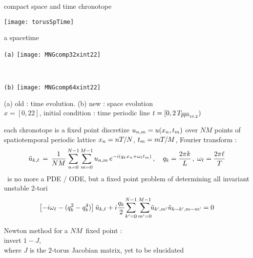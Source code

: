 \begin{frame}{compact space and time chronotope}
\begin{center}
\texttt{[image: torusSpTime]}
\end{center}
\end{frame}

\begin{frame}{a spacetime \po}
\begin{center}
  \begin{minipage}[height=.40\textheight]{.35\textwidth}
    \centering \small{\texttt{(a)}}
    \texttt{[image: MNGcomp32xint22]}
  \end{minipage}
~~~~~~~~~
  \begin{minipage}[height=.40\textheight]{.35\textwidth}
    \centering \small{\texttt{(b)}}
    \texttt{[image: MNGcomp64xint22]}
  \end{minipage}
\end{center}
    (a) old : time evolution. (b) new : space evolution
    \\
    $x=[0,22]$,
       initial condition : time periodic line $t = [0,
   2\,T_{\overline{ppo}_{10.2}})$
\end{frame}

\begin{frame}{each chronotope is a fixed point}
discretize $u_{n,m} = u(x_n,t_m)$ over
$N M$ points of spatiotemporal periodic lattice $x_n = n {T_{}}/N$,
 $t_m = m {T_{}}/M$, Fourier transform :
%
\[
\tilde{u}_{k,\ell} \,=\,
  \frac{1}{NM} \sum^{N-1}_{n=0} \sum^{M-1}_{m=0}
  u_{n,m} \, e^{-i(q_kx_n + \omega_\ell t_m)}
    \,,\quad
q_k = \frac{2 \pi k}{L}
    \,,\;
\omega_\ell = \frac{2 \pi \ell}{{T_{}}}
\]
\KS\ is no more a PDE / ODE, but a fixed point problem of
determining all invariant unstable 2-tori
\[
\left[- i \omega_\ell - ( q_k^2 - q_k^4 ) \right]\tilde{u}_{k,\ell}
+ i \frac{q_k}{2} \!\sum_{k'=0}^{N-1} \sum^{M-1}_{m'=0}\!\!
\tilde{u}_{k',m'} \tilde{u}_{k-k',m-m'}
    =
0
\]

\bigskip

Newton method for a $NM$\dmn\ fixed point :
\\ invert $1-J$,
\\ where $J$ is the
2-torus Jacobian matrix, yet to be elucidated
\end{frame}

